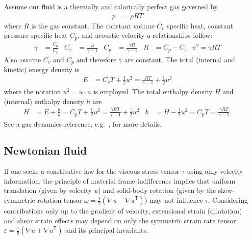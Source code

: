 \documentclass[letterpaper,11pt,nointlimits,reqno,draft]{amsbook}
\newcommand{\trans}[1]{{#1}^{\ensuremath{\mathsf{T}}}}
\begin{document}
Assume our fluid is a thermally and calorically perfect gas governed by
\begin{align}
  \label{eq:perfectgaseos}
  p &= \rho{} R T
\end{align}
where $R$ is the gas constant. The constant volume $C_{v}$ specific heat,
constant pressure specific heat $C_{p}$, and acoustic velocity $a$
relationships follow:
\begin{align}
  \label{eq:perfectgasrelations}
  \gamma &= \frac{C_{p}}{C_{v}}
  &
  C_{v} &= \frac{R}{\gamma - 1}
  &
  C_{p} &= \frac{\gamma{}R}{\gamma-1}
  &
  R &= C_{p} - C_{v}
  &
  a^{2} = \gamma{}RT
\end{align}
Also assume $C_{v}$ and $C_{p}$ and therefore $\gamma$ are constant.
The total (internal and kinetic) energy density is
\begin{align}
  \label{eq:perfectgastotalenergy}
  E &= C_{v} T + \frac{1}{2}u^{2}
     = \frac{RT}{\gamma-1} + \frac{1}{2}u^{2}
\end{align}
where the notation $u^2 = u\cdot{}u$ is employed.
The total enthalpy density $H$ and (internal) enthalpy density $h$ are
\begin{align}
  \label{eq:perfectgasenthalpy}
  H &= E + \frac{p}{\rho}
     = C_{p} T + \frac{1}{2}u^{2}
     = \frac{\gamma{}RT}{\gamma-1} + \frac{1}{2}u^{2}
  &
  h &= H - \frac{1}{2}u^{2}
     = C_{p} T
     = \frac{\gamma{}RT}{\gamma-1}
  .
\end{align}
See a gas dynamics reference, e.g.~\citet{LiepmannRoshko2002}, for more
details.

\subsection{Newtonian fluid}
\label{sec:newtonianfluid}

If one seeks a constitutive law for the viscous stress tensor $\tau$
using only velocity information, the principle of material frame
indifference implies that uniform translation (given by velocity $u$)
and solid-body rotation (given by the skew-symmetric rotation tensor
$\omega=\frac{1}{2}\left( \nabla{}u-\trans{\nabla{}u} \right)$)
may not influence $\tau$.  Considering contributions only up to the
gradient of velocity, extensional strain (dilatation) and shear strain
effects may depend on only the symmetric strain rate tensor
$\varepsilon=\frac{1}{2}\left( \nabla{}u+\trans{\nabla{}u}\right)$
and its principal invariants.
\end{document}
